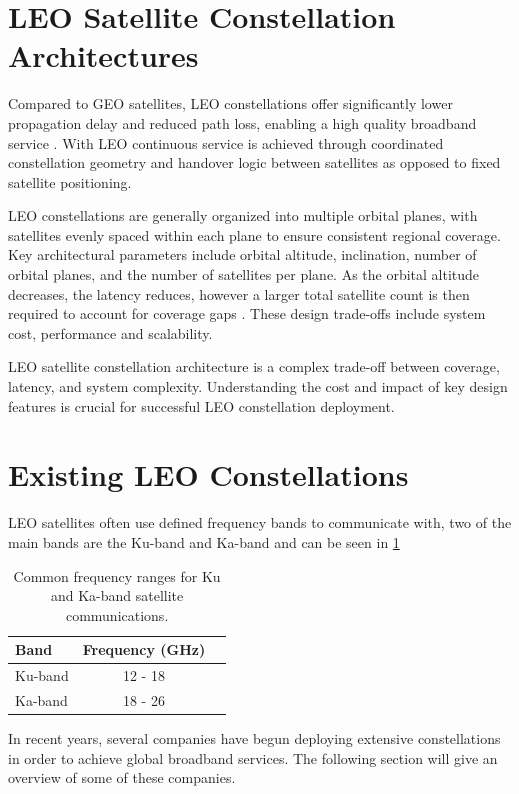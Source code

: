 \section{LEO Satellite Constellation Architectures}
Compared to GEO satellites, LEO constellations offer significantly lower propagation delay and reduced path loss, enabling a high quality broadband service \cite{2019AcAau.159..123D} \cite{10.1145/3286062.3286075}. With LEO continuous service is achieved through coordinated constellation geometry and handover logic between satellites as opposed to fixed satellite positioning.

LEO constellations are generally organized into multiple orbital planes, with satellites evenly spaced within each plane to ensure consistent regional coverage. Key architectural parameters include orbital altitude, inclination, number of orbital planes, and the number of satellites per plane. As the orbital altitude decreases, the latency reduces, however a larger total satellite count is then required to account for coverage gaps \cite{2019AcAau.159..123D} . These design trade-offs include system cost, performance and scalability. 

LEO satellite constellation architecture is a complex trade-off between coverage, latency, and system complexity. Understanding the cost and impact of key design features is crucial for successful LEO constellation deployment.  
\section{Existing LEO Constellations}
LEO satellites often use defined frequency bands to communicate with, two of the main bands are the Ku-band and Ka-band and can be seen in \ref{table:ku-ka-bands}
\FloatBarrier
\begin{table}[h!]
\caption{Common frequency ranges for Ku and Ka-band satellite communications\cite{esa_satellite_frequency_bands}.}
\label{table:ku-ka-bands}
\centering
\begin{tabular}{lcc}
\hline
\textbf{Band} & \textbf{ Frequency (GHz)} \\
\hline
Ku-band & 12 - 18\\
Ka-band & 18 - 26  \\
\hline
\end{tabular}
\end{table}

In recent years, several companies have begun deploying extensive constellations in order to achieve global broadband services. The following section will give an overview of some of these companies. 
